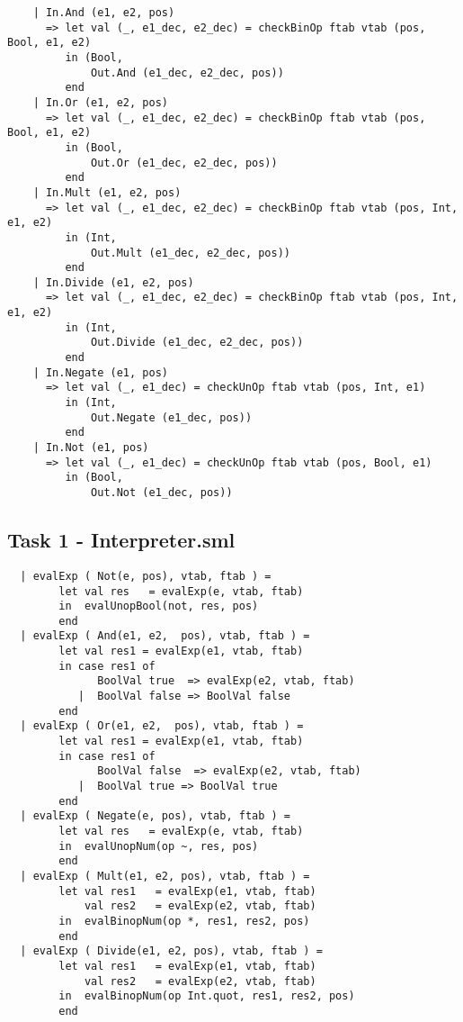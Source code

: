 \documentclass{article}
\begin{document}
\begin{lstlisting}
    | In.And (e1, e2, pos)
      => let val (_, e1_dec, e2_dec) = checkBinOp ftab vtab (pos, Bool, e1, e2)
         in (Bool,
             Out.And (e1_dec, e2_dec, pos))
         end
    | In.Or (e1, e2, pos)
      => let val (_, e1_dec, e2_dec) = checkBinOp ftab vtab (pos, Bool, e1, e2)
         in (Bool,
             Out.Or (e1_dec, e2_dec, pos))
         end
    | In.Mult (e1, e2, pos)
      => let val (_, e1_dec, e2_dec) = checkBinOp ftab vtab (pos, Int, e1, e2)
         in (Int,
             Out.Mult (e1_dec, e2_dec, pos))
         end
    | In.Divide (e1, e2, pos)
      => let val (_, e1_dec, e2_dec) = checkBinOp ftab vtab (pos, Int, e1, e2)
         in (Int,
             Out.Divide (e1_dec, e2_dec, pos))
         end
    | In.Negate (e1, pos)
      => let val (_, e1_dec) = checkUnOp ftab vtab (pos, Int, e1)
         in (Int,
             Out.Negate (e1_dec, pos))
         end
    | In.Not (e1, pos)
      => let val (_, e1_dec) = checkUnOp ftab vtab (pos, Bool, e1)
         in (Bool,
             Out.Not (e1_dec, pos))
\end{lstlisting}

\subsection{Task 1 - Interpreter.sml}\label{app:1inter}
\begin{lstlisting}
  | evalExp ( Not(e, pos), vtab, ftab ) =
        let val res   = evalExp(e, vtab, ftab)
        in  evalUnopBool(not, res, pos)
        end
  | evalExp ( And(e1, e2,  pos), vtab, ftab ) =
        let val res1 = evalExp(e1, vtab, ftab)
        in case res1 of
              BoolVal true  => evalExp(e2, vtab, ftab)
           |  BoolVal false => BoolVal false
        end
  | evalExp ( Or(e1, e2,  pos), vtab, ftab ) =
        let val res1 = evalExp(e1, vtab, ftab)
        in case res1 of
              BoolVal false  => evalExp(e2, vtab, ftab)
           |  BoolVal true => BoolVal true
        end
  | evalExp ( Negate(e, pos), vtab, ftab ) =
        let val res   = evalExp(e, vtab, ftab)
        in  evalUnopNum(op ~, res, pos)
        end
  | evalExp ( Mult(e1, e2, pos), vtab, ftab ) =
        let val res1   = evalExp(e1, vtab, ftab)
            val res2   = evalExp(e2, vtab, ftab)
        in  evalBinopNum(op *, res1, res2, pos)
        end
  | evalExp ( Divide(e1, e2, pos), vtab, ftab ) =
        let val res1   = evalExp(e1, vtab, ftab)
            val res2   = evalExp(e2, vtab, ftab)
        in  evalBinopNum(op Int.quot, res1, res2, pos)
        end
\end{lstlisting}
\end{document}
